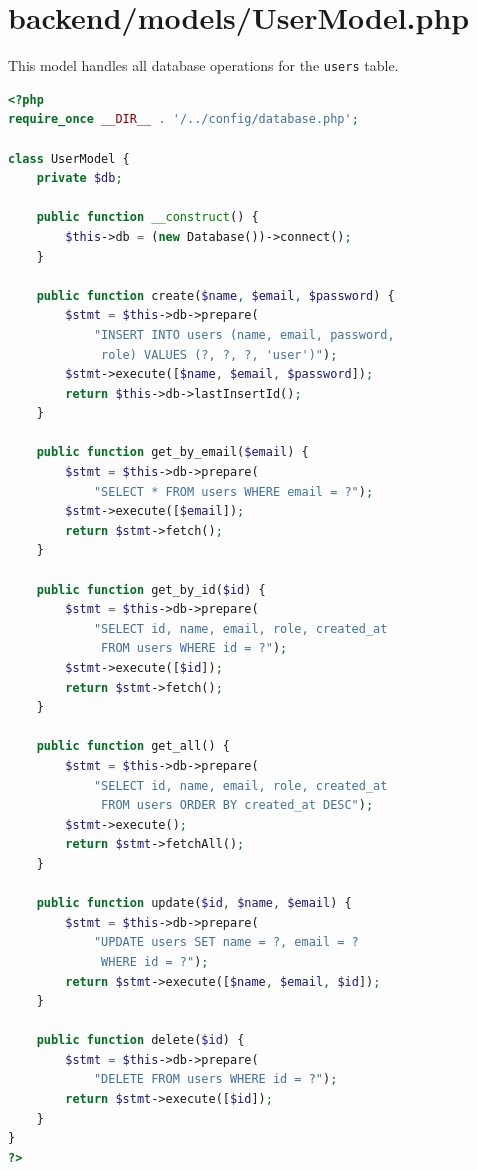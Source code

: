 \documentclass[12pt,a4paper]{report}
\begin{document}
\section{backend/models/UserModel.php}
This model handles all database operations for the \texttt{users} table.

\begin{lstlisting}[language=PHP]
<?php
require_once __DIR__ . '/../config/database.php';

class UserModel {
    private $db;

    public function __construct() {
        $this->db = (new Database())->connect();
    }

    public function create($name, $email, $password) {
        $stmt = $this->db->prepare(
            "INSERT INTO users (name, email, password,
             role) VALUES (?, ?, ?, 'user')");
        $stmt->execute([$name, $email, $password]);
        return $this->db->lastInsertId();
    }

    public function get_by_email($email) {
        $stmt = $this->db->prepare(
            "SELECT * FROM users WHERE email = ?");
        $stmt->execute([$email]);
        return $stmt->fetch();
    }

    public function get_by_id($id) {
        $stmt = $this->db->prepare(
            "SELECT id, name, email, role, created_at
             FROM users WHERE id = ?");
        $stmt->execute([$id]);
        return $stmt->fetch();
    }

    public function get_all() {
        $stmt = $this->db->prepare(
            "SELECT id, name, email, role, created_at
             FROM users ORDER BY created_at DESC");
        $stmt->execute();
        return $stmt->fetchAll();
    }

    public function update($id, $name, $email) {
        $stmt = $this->db->prepare(
            "UPDATE users SET name = ?, email = ?
             WHERE id = ?");
        return $stmt->execute([$name, $email, $id]);
    }

    public function delete($id) {
        $stmt = $this->db->prepare(
            "DELETE FROM users WHERE id = ?");
        return $stmt->execute([$id]);
    }
}
?>
\end{lstlisting}
\end{document}
